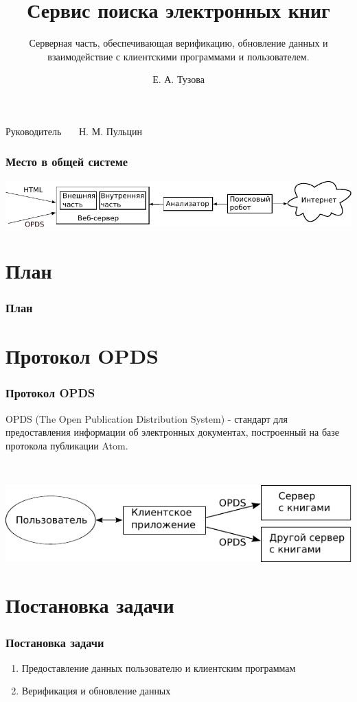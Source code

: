 \documentclass[utf8,handout]{beamer}
\title{Сервис поиска электронных книг }
\subtitle{Серверная часть, обеспечивающая верификацию, обновление данных и взаимодействие с клиентскими программами и пользователем.}
\author{Е. А. Тузова}
\institute{Академический Университет РАН}
\date{}
\begin{document}
\begin{frame}
  \titlepage

  \begin{flushright}
  
    Руководитель~~~  Н. М. Пульцин

  \end{flushright}
\end{frame}


\begin{frame}
	\frametitle{Место в общей системе}
	\includegraphics[width=1.05\textwidth]{./head/innerstructure-new}
\end{frame}

\section*{План}
  \begin{frame}
    \frametitle{План}
    \tableofcontents[pausesections]

  \end{frame}

\section{Протокол OPDS}
  \begin{frame}
    \frametitle{Протокол OPDS}
    \begin{block}{}
	OPDS (The Open Publication Distribution System) - стандарт для предоставления информации об электронных документах, построенный на базе протокола публикации Atom.
	\end{block}
	\ 
    
	\includegraphics{./head/scheme}
  \end{frame}

\section{Постановка задачи}
  \begin{frame}

    \frametitle{Постановка задачи}
    \begin{enumerate}
      \item Предоставление данных пользователю и клиентским программам
      \item Верификация и обновление данных
    \end{enumerate}
  \end{frame}
\end{document}
